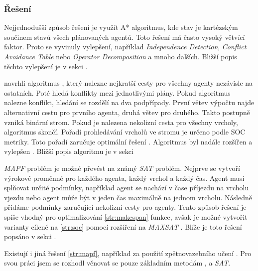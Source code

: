 \subsubsection{Řešení~}\label{subsubsec:reseni_offline_mapf}



Nejjednodušší způsob řešení je využít A* algoritmus, kde stav je kartézským součinem stavů všech plánovaných agentů.
Toto řešení má často vysoký větvící faktor.
Proto se vyvinuly vylepšení, například \emph{Independence Detection}, \emph{Conflict Avoidance Table} nebo
\emph{Operator Decomposition} \citep{Standley_2010} a mnoho dalších.
Bližší popis těchto vylepšení je v sekci . %

\citet*{Sharon} navrhli algoritmus ,
který nalezne nejkratší cesty pro všechny agenty nezávisle na ostatních.
Poté hledá konflikty mezi jednotlivými plány.
Pokud algoritmus nalezne konflikt, hledání se rozdělí na dva podpřípady.
První větev výpočtu najde alternativní cestu pro prvního agenta, druhá větev pro druhého.
Takto postupně vzniká binární strom.
Pokud je nalezena nekolizní cesta pro všechny vrcholy, algoritmus skončí.
Pořadí prohledávání vrcholů ve stromu je určeno podle SOC metriky.
Toto pořadí zaručuje optimální řešení \citep{Sharon}.
Algoritmus byl nadále rozšířen a vylepšen \citep{Boyarski}.
Bližší popis algoritmu je v sekci 

\emph{MAPF} problém je možné převést na známý \emph{SAT} problém.  %
Nejprve se vytvoří výrokové proměnné pro každého agenta, každý vrchol a každý čas.
Agent musí splňovat určité podmínky, například agent se nachází v čase příjezdu na vrcholu vjezdu
nebo agent může být v jeden čas maximálně na jednom vrcholu.
Následně přidáme podmínky zaručující nekolizní cesty pro agenty.
Tento způsob řešení je spíše vhodný pro optimalizování \ref{str:makespan} funkce,
avšak je možné vytvořit varianty cílené na \ref{str:soc} pomocí rozšíření na \emph{MAXSAT} \citep{bartak}.
Blíže je toto řešení popsáno v sekci .

Existují i jiná řešení \ref{str:mapf}, například za použití zpětnovazebního učení \citep*{Zhiyao}.
Pro svou práci jsem se rozhodl věnovat se pouze základním metodám
,  a \emph{SAT}. %

